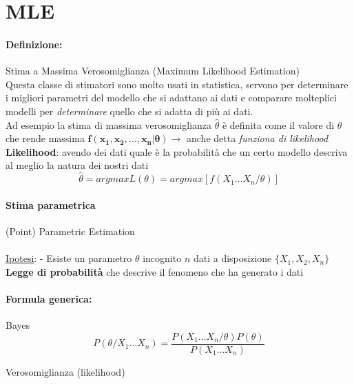 \documentclass[]{article}
\newcommand{\definizione}{\paragraph{Definizione:}}
\newcommand{\formula}{\paragraph{Formula generica:}}
\begin{document}
    \section{MLE}
    \definizione Stima a Massima Verosomiglianza (Maximum Likelihood Estimation) \\
    Questa classe di stimatori sono molto usati in statistica, servono per determinare i migliori parametri del modello che si adattano ai dati e comparare molteplici modelli per \textit{determinare} quello che si adatta di più ai dati. \\
    Ad esempio la stima di massima verosomiglianza $\hat{\theta}$ è definita come il valore di $\theta$ che rende massima $\boldsymbol{f(x_1, x_2, \ldots, x_n \rvert \theta)} \rightarrow$ anche detta \textit{funziona di likelihood} \\[2ex]
    \textbf{Likelihood}: avendo dei dati quale è la probabilità che un certo modello descriva al meglio la natura dei nostri dati
    \[ \hat{\theta} = argmax L(\theta) = argmax[f(X_1 \ldots X_n / \theta )] \]
    \paragraph{Stima parametrica}(Point) Parametric Estimation \\ \\
    \underline{Ipotesi}:
    - Esiste un parametro $\theta$ incognito $n$ dati a disposizione $\{X_1, X_2, X_n\}$ \\
    \textbf{Legge di probabilità} che descrive il fenomeno che ha generato i dati
    \formula Bayes
    \[ P(\theta / X_1 \ldots X_n) = \frac{P(X_1 \ldots X_n / \theta) P(\theta)}{P(X_1 \ldots X_n)} \]
    \centerline{Verosomiglianza (likelihood)}
\end{document}
